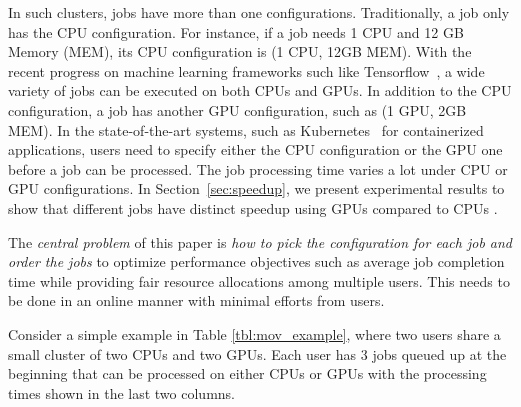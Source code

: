 In such clusters, jobs have more than one configurations. 
Traditionally, a job only has the CPU configuration. For instance, if a job needs 1 CPU and 12 GB Memory (MEM), its CPU configuration is (1 CPU, 12GB MEM). 
With the recent progress on machine learning frameworks such like Tensorflow~\cite{tensorflow}, a wide variety of jobs can be executed on both CPUs and GPUs. 
In addition to the CPU configuration, a job has another GPU configuration, such as (1 GPU, 2GB MEM). 
In the state-of-the-art systems, such as Kubernetes~\cite{kubernetes} for containerized applications, users need to specify either the CPU configuration or the GPU one before a job can be processed. 
The job processing time varies a lot under CPU or GPU configurations. 
In Section~\ref{sec:speedup}, we present experimental results to show that different jobs have distinct speedup using GPUs compared to CPUs .




The \emph{central problem} of this paper is \emph{how to pick the configuration for each job and order the jobs} to optimize performance objectives such as average job completion time while providing fair resource allocations among multiple users. This needs to be done in an online manner with minimal efforts from users.


Consider a simple example in Table \ref{tbl:mov_example}, where two users share a small cluster of two CPUs and two GPUs. 
Each user has 3 jobs queued up at the beginning that can be processed on either CPUs or GPUs with the processing times shown in the last two columns.

